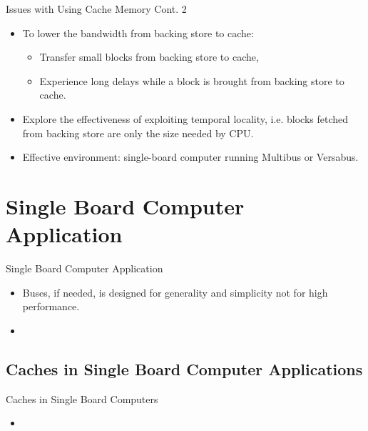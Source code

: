 \documentclass{beamer}
\begin{document}
\begin{frame}{Issues with Using Cache Memory Cont. 2}
	
	\begin{itemize}
		\item {
			To lower the bandwidth from backing store to cache:
			\begin{itemize}
				\item {
					Transfer small blocks from backing store to cache, 
				}
				\item{
					Experience long delays while a block is brought from backing store to cache.
				}
			\end{itemize} 
			\pause
		}
		\item{
			Explore the effectiveness of exploiting temporal locality, i.e. blocks fetched from backing store are only the size needed by CPU.
		}
		\item{
			Effective environment: single-board computer running Multibus or Versabus.
		}
	\end{itemize}
	
\end{frame}


\section{Single Board Computer Application}

\begin{frame}{Single Board Computer Application}
	\begin{itemize}
		\item {
			Buses, if needed, is designed for generality and simplicity not for high performance.
		}
		\item{
			
		}
	\end{itemize}
\end{frame}

\subsection{Caches in Single Board Computer Applications}

\begin{frame}{Caches in Single Board Computers}
	\begin{itemize}
		\item {
			
		}
	\end{itemize}
\end{frame}
\end{document}

